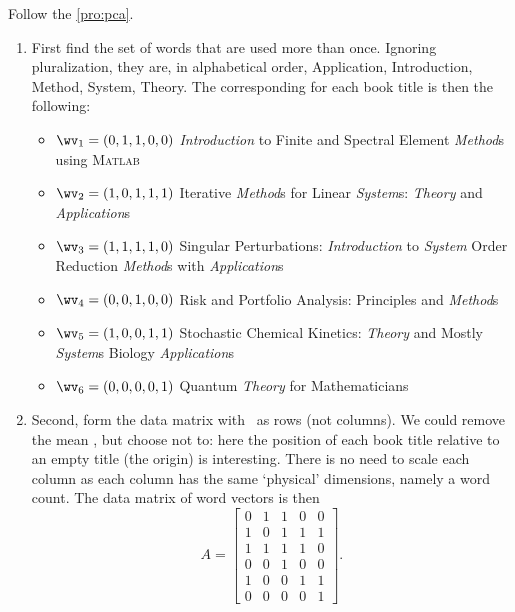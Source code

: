 
Follow the  \cref{pro:pca}.
\begin{enumerate}
\item 
First find the set of words that are used more than once.
Ignoring pluralization, they are, in alphabetical order, 
Application, Introduction, Method, System, Theory.
The corresponding  for each book title is then the following:
\begin{itemize}
\item \(\wv_1=(0,1,1,0,0)\) \emph{Introduction} to Finite and Spectral Element \emph{Method}s using \textsc{Matlab}
\item \(\wv_2=(1,0,1,1,1)\) Iterative \emph{Method}s for Linear \emph{System}s: \emph{Theory} and \emph{Application}s 
\item \(\wv_3=(1,1,1,1,0)\) Singular Perturbations: \emph{Introduction} to \emph{System} Order Reduction \emph{Method}s with \emph{Application}s 
\item \(\wv_4=(0,0,1,0,0)\) Risk and Portfolio Analysis: Principles and \emph{Method}s 
\item \(\wv_5=(1,0,0,1,1)\) Stochastic Chemical Kinetics: \emph{Theory} and Mostly \emph{System}s Biology \emph{Application}s
\item \(\wv_6=(0,0,0,0,1)\) Quantum \emph{Theory} for Mathematicians 
\end{itemize}

\item Second, form the data matrix with \hlist{}\ as rows (not columns).
We could remove the mean , but choose not to: here the position of each book title relative to an empty title (the origin) is interesting.
There is no need to scale each column as each column has the same `physical' dimensions, namely a word count.
The data matrix of word vectors is then
\begin{equation*}
A=\begin{bmatrix} 0&1&1&0&0
\\1&0&1&1&1
\\1&1&1&1&0
\\0&0&1&0&0
\\1&0&0&1&1
\\0&0&0&0&1 \end{bmatrix}.
\end{equation*}
\setbox\ajrqrbox\hbox{}%
\marginajrbox%



\end{enumerate}
